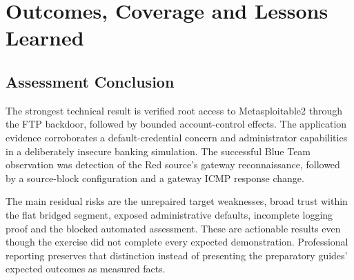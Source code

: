 \documentclass[11pt,a4paper]{article}
\newcommand{\partheading}[2]{\clearpage\noindent{\small\bfseries\color{steel}#1}\par\section{#2}}
\begin{document}
\partheading{08 / CONCLUSIONS}{Outcomes, Coverage and Lessons Learned}
\subsection{Assessment Conclusion}
The strongest technical result is verified root access to Metasploitable2 through the FTP backdoor, followed by bounded account-control effects. The application evidence corroborates a default-credential concern and administrator capabilities in a deliberately insecure banking simulation. The successful Blue Team observation was detection of the Red source's gateway reconnaissance, followed by a source-block configuration and a gateway ICMP response change.

The main residual risks are the unrepaired target weaknesses, broad trust within the flat bridged segment, exposed administrative defaults, incomplete logging proof and the blocked automated assessment. These are actionable results even though the exercise did not complete every expected demonstration. Professional reporting preserves that distinction instead of presenting the preparatory guides' expected outcomes as measured facts.
\end{document}
